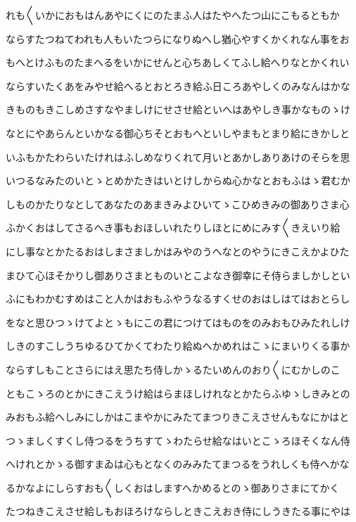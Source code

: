 \documentclass[a4paper,11pt,landscape]{ltjtarticle}
\begin{document}
れも〱いかにおもはんあやにくにのたまふ人はたやへたつ山にこもるともか
\par\medskip
ならすたつねてわれも人もいたつらになりぬへし猶心やすくかくれなん事をお
\par\medskip
もへとけふものたまへるをいかにせんと心ちあしくてふし給へりなとかくれい
\par\medskip
ならすいたくあをみやせ給へるとおとろき給ふ日ころあやしくのみなんはかな
\par\medskip
きものもきこしめさすなやましけにせさせ給といへはあやしき事かなものゝけ
\par\medskip
なとにやあらんといかなる御心ちそとおもへといしやまもとまり給にきかしと
\par\medskip
いふもかたわらいたけれはふしめなりくれて月いとあかしありあけのそらを思
\par\medskip
いつるなみたのいとゝとめかたきはいとけしからぬ心かなとおもふはゝ君むか
\par\medskip
しものかたりなとしてあなたのあまきみよひいてゝこひめきみの御ありさま心
\par\medskip
ふかくおはしてさるへき事もおほしいれたりしほとにめにみす〱きえいり給
\par\medskip
にし事なとかたるおはしまさましかはみやのうへなとのやうにきこえかよひた
\par\medskip
まひて心ほそかりし御ありさまとものいとこよなき御幸にそ侍らましかしとい
\par\medskip
ふにもわかむすめはこと人かはおもふやうなるすくせのおはしはてはおとらし
\par\medskip
をなと思ひつゝけてよとゝもにこの君につけてはものをのみおもひみたれしけ
\par\medskip
しきのすこしうちゆるひてかくてわたり給ぬへかめれはこゝにまいりくる事か
\par\medskip
ならすしもことさらにはえ思たち侍しかゝるたいめんのおり〱にむかしのこ
\par\medskip
ともこゝろのとかにきこえうけ給はらまほしけれなとかたらふゆゝしきみとの
\par\medskip
みおもふ給へしみにしかはこまやかにみたてまつりきこえさせんもなにかはと
\par\medskip
つゝましくすくし侍つるをうちすてゝわたらせ給なはいとこゝろほそくなん侍
\par\medskip
へけれとかゝる御すまゐは心もとなくのみみたてまつるをうれしくも侍へかな
\par\medskip
るかなよにしらすおも〱しくおはしますへかめるとのゝ御ありさまにてかく
\par\medskip
たつねきこえさせ給しもおほろけならしときこえおき侍にしうきたる事にやは
\end{document}
